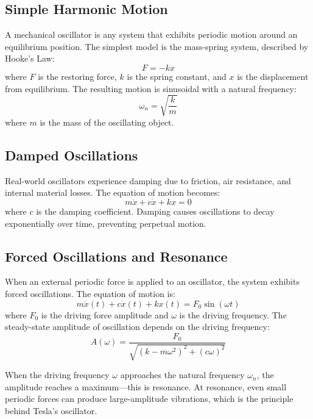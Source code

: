 \documentclass[12pt,a4paper]{article}
\begin{document}
\subsection*{Simple Harmonic Motion}
A mechanical oscillator is any system that exhibits periodic motion around an equilibrium position. The simplest model is the mass-spring system, described by Hooke's Law:
\begin{equation}
F = -kx
\end{equation}
where $F$ is the restoring force, $k$ is the spring constant, and $x$ is the displacement from equilibrium. The resulting motion is sinusoidal with a natural frequency:
\begin{equation}
\omega_n = \sqrt{\frac{k}{m}}
\end{equation}
where $m$ is the mass of the oscillating object.

\subsection*{Damped Oscillations}
Real-world oscillators experience damping due to friction, air resistance, and internal material losses. The equation of motion becomes:
\begin{equation}
m\ddot{x} + c\dot{x} + kx = 0
\end{equation}
where $c$ is the damping coefficient. Damping causes oscillations to decay exponentially over time, preventing perpetual motion.

\subsection*{Forced Oscillations and Resonance}
When an external periodic force is applied to an oscillator, the system exhibits forced oscillations. The equation of motion is:
\begin{equation}
m\ddot{x}(t) + c\dot{x}(t) + kx(t) = F_0 \sin(\omega t)
\end{equation}
where $F_0$ is the driving force amplitude and $\omega$ is the driving frequency. The steady-state amplitude of oscillation depends on the driving frequency:
\begin{equation}
A(\omega) = \frac{F_0}{\sqrt{(k - m\omega^2)^2 + (c\omega)^2}}
\end{equation}

When the driving frequency $\omega$ approaches the natural frequency $\omega_n$, the amplitude reaches a maximum---this is resonance. At resonance, even small periodic forces can produce large-amplitude vibrations, which is the principle behind Tesla's oscillator.
\end{document}
